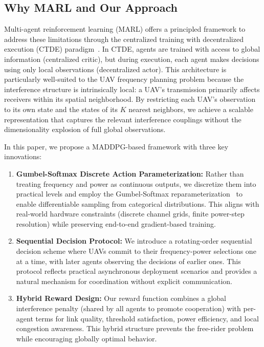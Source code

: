 \documentclass[conference]{IEEEtran}
\begin{document}
\subsection{Why MARL and Our Approach}

Multi-agent reinforcement learning (MARL) offers a principled framework to address these limitations through the centralized training with decentralized execution (CTDE) paradigm~\cite{ref_ctde1,ref_maddpg_original}. In CTDE, agents are trained with access to global information (centralized critic), but during execution, each agent makes decisions using only local observations (decentralized actor). This architecture is particularly well-suited to the UAV frequency planning problem because the interference structure is intrinsically local: a UAV's transmission primarily affects receivers within its spatial neighborhood. By restricting each UAV's observation to its own state and the states of its $K$ nearest neighbors, we achieve a scalable representation that captures the relevant interference couplings without the dimensionality explosion of full global observations.

In this paper, we propose a MADDPG-based framework with three key innovations:
\begin{enumerate}
    \item \textbf{Gumbel-Softmax Discrete Action Parameterization:} Rather than treating frequency and power as continuous outputs, we discretize them into practical levels and employ the Gumbel-Softmax reparameterization~\cite{ref_gumbel_softmax} to enable differentiable sampling from categorical distributions. This aligns with real-world hardware constraints (discrete channel grids, finite power-step resolution) while preserving end-to-end gradient-based training.
    \item \textbf{Sequential Decision Protocol:} We introduce a rotating-order sequential decision scheme where UAVs commit to their frequency-power selections one at a time, with later agents observing the decisions of earlier ones. This protocol reflects practical asynchronous deployment scenarios and provides a natural mechanism for coordination without explicit communication.
    \item \textbf{Hybrid Reward Design:} Our reward function combines a global interference penalty (shared by all agents to promote cooperation) with per-agent terms for link quality, threshold satisfaction, power efficiency, and local congestion awareness. This hybrid structure prevents the free-rider problem while encouraging globally optimal behavior.
\end{enumerate}
\end{document}
